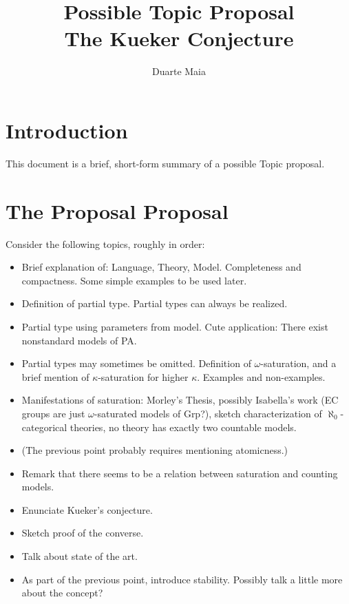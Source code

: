 \documentclass{article}
\title{Possible Topic Proposal\\The Kueker Conjecture}
\author{Duarte Maia}
\theoremstyle{nonumberplain}
\begin{document}
\maketitle


\section{Introduction}

This document is a brief, short-form summary of a possible Topic proposal.

\section{The Proposal Proposal}

Consider the following topics, roughly in order:

\begin{itemize}
\item Brief explanation of: Language, Theory, Model. Completeness and compactness. Some simple examples to be used later.
\item Definition of partial type. Partial types can always be realized.
\item Partial type using parameters from model. Cute application: There exist nonstandard models of PA.
\item Partial types may sometimes be omitted. Definition of $\omega$-saturation, and a brief mention of $\kappa$-saturation for higher $\kappa$. Examples and non-examples.
\item Manifestations of saturation: Morley's Thesis, possibly Isabella's work (EC groups are just $\omega$-saturated models of Grp?), sketch characterization of $\aleph_0$-categorical theories, no theory has exactly two countable models.
\item (The previous point probably requires mentioning atomicness.)
\item Remark that there seems to be a relation between saturation and counting models.
\item Enunciate Kueker's conjecture.
\item Sketch proof of the converse.
\item Talk about state of the art.
\item As part of the previous point, introduce stability. Possibly talk a little more about the concept?
\end{itemize}

%
%
\end{document}
